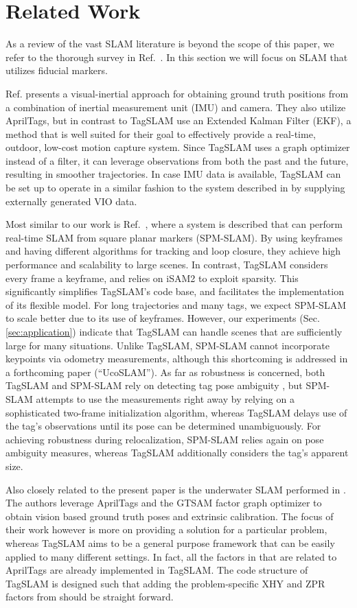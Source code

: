 \section{Related Work}
As a review of the vast SLAM literature is beyond the scope of this
paper, we refer to the thorough survey in Ref.\ \cite{cadena2016}. In
this section we will focus on SLAM that utilizes fiducial markers.

Ref. \cite{neunert2016} presents a visual-inertial approach for
obtaining ground truth positions from a combination of inertial
measurement unit (IMU) and camera. They also utilize April\-Tags, but in
contrast to TagSLAM use an Extended Kalman Filter (EKF), a method that
is well suited for their goal to effectively provide a real-time,
outdoor, low-cost motion capture system. Since TagSLAM uses a graph
optimizer instead of a filter, it can leverage observations from both
the past and the future, resulting in 
smoother trajectories. In case IMU data is available, TagSLAM can be set up
to operate in a similar fashion to the system described in
\cite{neunert2016} by supplying externally generated VIO data.

Most similar to our work is Ref.\ \cite{munoz2018}, where a system is
described that can perform real-time SLAM from square planar markers
(SPM-SLAM). By using keyframes and having different algorithms for
tracking and loop closure, they achieve high performance and
scalability to large scenes. In
contrast, TagSLAM considers every frame a keyframe, and relies on
iSAM2 \cite{kaess2011} to exploit sparsity. This significantly simplifies
TagSLAM's code base, and facilitates the implementation of its
flexible model.
For long trajectories and many tags, we expect SPM-SLAM to scale
better due to its use of keyframes. However, our
experiments (Sec. \ref{sec:application}) indicate that TagSLAM can handle
scenes that are sufficiently large for many situations. Unlike
TagSLAM, SPM-SLAM cannot incorporate keypoints via odometry
measurements, although this shortcoming is addressed in a forthcoming
paper (``UcoSLAM''). As far as robustness is concerned, both TagSLAM and
SPM-SLAM rely on detecting tag pose ambiguity \cite{schweighofer2006},
but SPM-SLAM attempts to use the measurements right away by relying on
a sophisticated two-frame initialization algorithm, whereas TagSLAM delays use
of the tag's observations until its pose can be determined
unambiguously. For achieving robustness during relocalization,
SPM-SLAM relies again on pose ambiguity measures, whereas TagSLAM
additionally considers the tag's apparent size.

Also closely related to the present paper is the underwater SLAM performed
in \cite{westman2018}. The authors leverage AprilTags and the
GTSAM factor graph optimizer to obtain vision based ground truth poses
and extrinsic calibration. The focus of their work however is more on
providing a solution for a particular problem, whereas TagSLAM aims to
be a general purpose framework that can be easily applied to many
different settings. In fact, all the factors in \cite{westman2018}
that are related to AprilTags are already implemented in TagSLAM. The
code structure of TagSLAM is designed such that adding the
problem-specific XHY and ZPR factors from \cite{westman2018} should be
straight forward.



